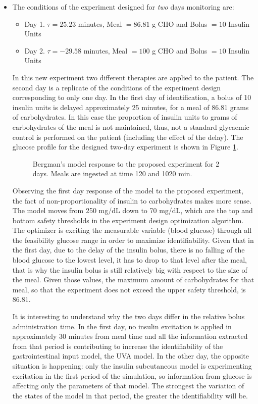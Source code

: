\begin{itemize}
\item{The conditions of the experiment designed for \textit{two} days monitoring are:

\begin{itemize}
	\item Day 1. $\tau = 25.23$ minutes, Meal $= 86.81$ g CHO and Bolus $=10$ Insulin Units
	\item Day 2. $\tau = -29.58$ minutes, Meal $= 100$ g CHO and Bolus $=10$ Insulin Units
\end{itemize}

In this new experiment two different therapies are applied to the patient. The second day is a replicate of the conditions of the experiment design corresponding to only one day. In the first day of identification, a bolus of 10 insulin units is delayed approximately 25 minutes, for a meal of 86.81 grams of carbohydrates. In this case the proportion of insulin units to grams of carbohydrates of the meal is not maintained, thus, not a standard glycaemic control is performed on the patient (including the effect of the delay). The glucose profile for the designed two-day experiment is shown in Figure \ref{fig:bergmanexperiment2day}.

\begin{figure}[hbtp]
\centering
{}\caption{Bergman's model response to the proposed experiment for 2 days. Meals are ingested at time 120 and 1020 min.}
\label{fig:bergmanexperiment2day}
\end{figure}

Observing the first day response of the model to the proposed experiment, the fact of non-proportionality of insulin to carbohydrates makes more sense. The model moves from 250 mg/dL down to 70 mg/dL, which are the top and bottom safety thresholds in the experiment design optimization algorithm. The optimizer is exciting the measurable variable (blood glucose) through all the feasibility glucose range in order to maximize identifiability. Given that in the first day, due to the delay of the insulin bolus, there is no falling of the blood glucose to the lowest level, it has to drop to that level after the meal, that is why the insulin bolus is still relatively big with respect to the size of the meal. Given those values, the maximum amount of carbohydrates for that meal, so that the experiment does not exceed the upper safety threshold, is $86.81$.

It is interesting to understand why the two days differ in the relative bolus administration time. In the first day, no insulin excitation is applied in approximately 30 minutes from meal time and all the information extracted from that period is contributing to increase the identifiability of the gastrointestinal input model, the UVA model. In the other day, the opposite situation is happening: only the insulin subcutaneous model is experimenting excitation in the first period of the simulation, so information from glucose is affecting only the parameters of that model. The strongest the variation of the states of the model in that period, the greater the identifiability will be.}


\end{itemize}
